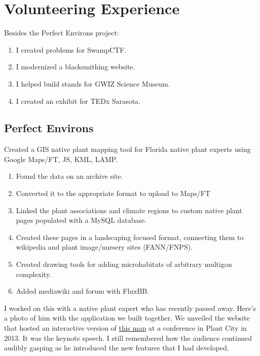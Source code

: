 \documentclass[../resume.tex]{subfiles}
\begin{document}
\section{Volunteering Experience}
Besides the Perfect Environs project:
\begin{enumerate}
\item I created problems for SwampCTF.
\item I modernized a blacksmithing website.
\item I helped build stands for GWIZ Science Museum.
\item I created an exhibit for TEDx Sarasota.
\end{enumerate}
\subsection{Perfect Environs}
Created a GIS native plant mapping tool for Florida native plant experts using Google Maps/FT, JS, KML, LAMP.
\begin{enumerate}
\item Found the data on an archive site. 
\item Converted it to the appropriate format to upload to Maps/FT
\item Linked the plant associations and climate regions to custom native plant pages populated with a MySQL database.
\item Created these pages in a landscaping focused format, connecting them to wikipedia and plant image/nursery sites (FANN/FNPS).
\item Created drawing tools for adding microhabitats of arbitrary multigon complexity. 
\item Added mediawiki and forum with FluxBB.
\end{enumerate}

I worked on this with a native plant expert who has recently passed away.  Here's a photo of him with the application we built together.  We unveiled the website that hosted an interactive version of \href{https://www.plantrealflorida.org/images/maps/vegetation_map_large.pdf}{this map} at a conference in Plant City in 2013. It was the keynote speech. I still remembered how the audience continued audibly gasping as he introduced the new features that I had developed.
\end{document}
